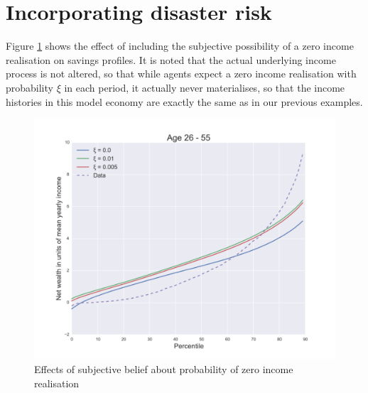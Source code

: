 \section{Incorporating disaster risk}
Figure \ref{fig:disaster} shows the effect of including the subjective possibility 
of a zero income realisation on savings profiles. It is noted that the actual 
underlying income process is not altered, so that while agents expect a zero 
income realisation with probability $\xi$ in each period, it actually never 
materialises, so that the income histories in this model economy are exactly 
the same as in our previous examples. 
\begin{figure}
\includegraphics[width=\columnwidth]{disaster}
\caption{Effects of subjective belief about probability of zero income 
           realisation}
\label{fig:disaster}
\end{figure}

